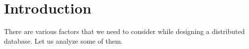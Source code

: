 \section{Introduction}

There are various factors that we need to consider while designing a distributed database. Let us analyze some of them.